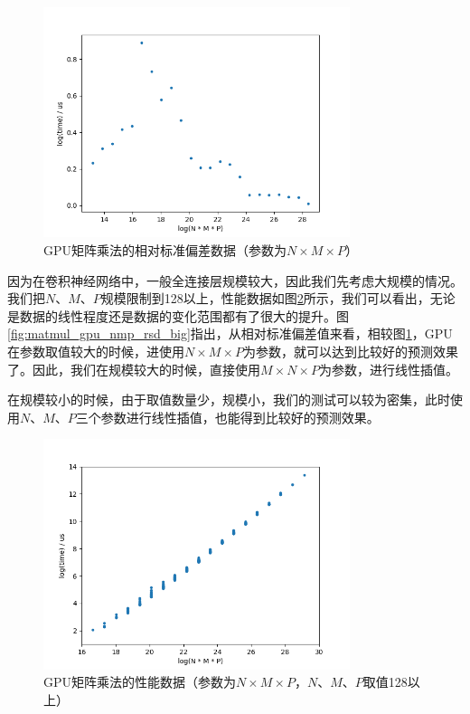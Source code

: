     \begin{figure}[!htbp]
        \centering
        \includegraphics[width=0.8\textwidth]{figures/matmul_gpu_nmp_rsd.png}
        \caption{GPU矩阵乘法的相对标准偏差数据（参数为$ N \times M \times P $）}
        \label{fig:matmul_gpu_nmp_rsd}
    \end{figure}
    
    因为在卷积神经网络中，一般全连接层规模较大，因此我们先考虑大规模的情况。我们把$ N $、$ M $、$ P $规模限制到128以上，性能数据如图\ref{fig:matmul_gpu_nmp_big}所示，我们可以看出，无论是数据的线性程度还是数据的变化范围都有了很大的提升。图\ref{fig:matmul_gpu_nmp_rsd_big}指出，从相对标准偏差值来看，相较图\ref{fig:matmul_gpu_nmp_rsd}，GPU在参数取值较大的时候，进使用$ N \times M \times P $为参数，就可以达到比较好的预测效果了。因此，我们在规模较大的时候，直接使用$ M \times N \times P $为参数，进行线性插值。
    
    在规模较小的时候，由于取值数量少，规模小，我们的测试可以较为密集，此时使用$ N $、$ M $、$ P $三个参数进行线性插值，也能得到比较好的预测效果。

    \begin{figure}[!htbp]
        \centering
        \includegraphics[width=0.8\textwidth]{figures/matmul_gpu_nmp_big.png}
        \caption{GPU矩阵乘法的性能数据（参数为$N \times M \times P $，$ N $、$ M $、$ P $取值128以上）}
        \label{fig:matmul_gpu_nmp_big}
    \end{figure}

